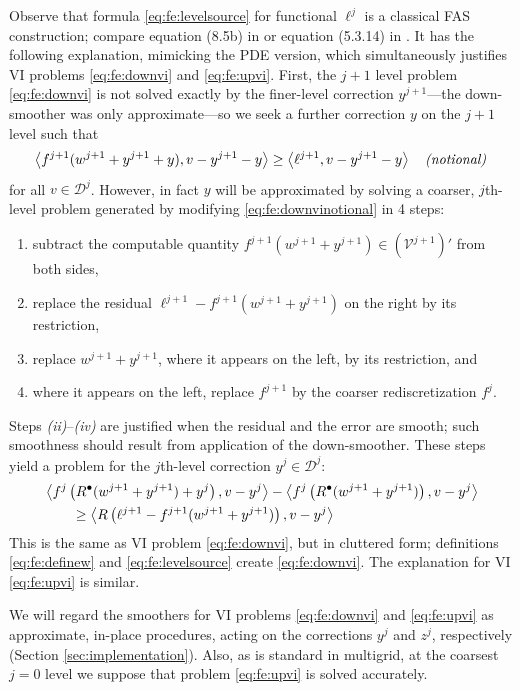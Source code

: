 \documentclass[letterpaper,final,12pt,reqno]{amsart}
\theoremstyle{cstyle}
\theoremstyle{cstyle*}
\theoremstyle{dstyle}
\numberwithin{equation}{section}
\numberwithin{figure}{section}
\numberwithin{table}{section}
\numberwithin{theorem}{section}
\newcommand{\ip}[2]{\left<#1,#2\right>}
\newcommand{\iR}{R^{\bullet}}
\begin{document}
Observe that formula \eqref{eq:fe:levelsource} for functional $\ell^j$ is a classical FAS construction; compare equation (8.5b) in \cite{BrandtLivne2011} or equation (5.3.14) in \cite{Trottenbergetal2001}.  It has the following explanation, mimicking the PDE version, which simultaneously justifies VI problems \eqref{eq:fe:downvi} and \eqref{eq:fe:upvi}.  First, the $j+1$ level problem \eqref{eq:fe:downvi} is not solved exactly by the finer-level correction $y^{j+1}$---the down-smoother was only approximate---so we seek a further correction $y$ on the $j+1$ level such that
\begin{equation}
\ip{f^{j+1}(w^{j+1}+y^{j+1}+y)}{v-y^{j+1}-y} \ge \ip{\ell^{j+1}}{v-y^{j+1}-y} \quad \text{\emph{(notional)}} \label{eq:fe:downvinotional}
\end{equation}
for all $v\in \mathcal{D}^j$.  However, in fact $y$ will be approximated by solving a coarser, $j$th-level problem generated by modifying \eqref{eq:fe:downvinotional} in 4 steps:
\begin{enumerate}
\item subtract the computable quantity $f^{j+1}(w^{j+1}+y^{j+1}) \in (\mathcal{V}^{j+1})'$ from both sides,
\item replace the residual $\ell^{j+1}-f^{j+1}(w^{j+1}+y^{j+1})$ on the right by its restriction,
\item replace $w^{j+1}+y^{j+1}$, where it appears on the left, by its restriction, and
\item where it appears on the left, replace $f^{j+1}$ by the coarser rediscretization $f^j$.
\end{enumerate}
Steps \emph{(ii)}--\emph{(iv)} are justified when the residual and the error are smooth; such smoothness should result from application of the down-smoother.  These steps yield a problem for the $j$th-level correction $y^j \in \mathcal{D}^j$:
\begin{align}
&\ip{f^j\left(\iR(w^{j+1}+y^{j+1})+y^j\right)}{v-y^j} - \ip{f^j\left(\iR(w^{j+1}+y^{j+1})\right)}{v-y^j} \label{eq:fe:downvicluttered} \\
&\qquad \ge \ip{R\left(\ell^{j+1}-f^{j+1}(w^{j+1}+y^{j+1})\right)}{v-y^j} \notag
\end{align}
This is the same as VI problem \eqref{eq:fe:downvi}, but in cluttered form; definitions \eqref{eq:fe:definew} and \eqref{eq:fe:levelsource} create \eqref{eq:fe:downvi}.  The explanation for VI \eqref{eq:fe:upvi} is similar.

We will regard the smoothers for VI problems \eqref{eq:fe:downvi} and \eqref{eq:fe:upvi} as approximate, in-place procedures, acting on the corrections $y^j$ and $z^j$, respectively (Section \ref{sec:implementation}).  Also, as is standard in multigrid, at the coarsest $j=0$ level we suppose that problem \eqref{eq:fe:upvi} is solved accurately.
\end{document}

